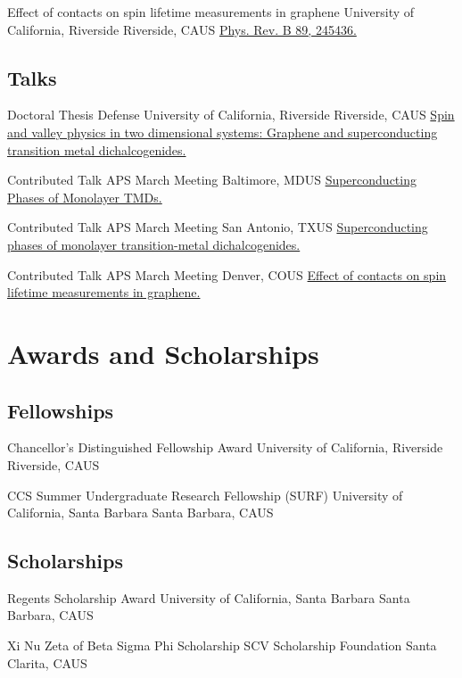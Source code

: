\documentclass[10pt,letter]{moderncv}
\begin{document}
    {Effect of contacts on spin lifetime measurements in graphene}
    {University of California, Riverside}
    {Riverside, CA}{US}
    {\href{https://journals.aps.org/prb/abstract/10.1103/PhysRevB.89.245436}
      {Phys. Rev. B 89, 245436.}}

  \subsection{Talks}

    {Doctoral Thesis Defense}
    {University of California, Riverside}
    {Riverside, CA}{US}
    {\href{https://evansosenko.com/deck-doctoral-thesis/}
      {Spin and valley physics in two dimensional systems: Graphene and superconducting transition metal dichalcogenides.}}

    {Contributed Talk}
    {APS March Meeting}
    {Baltimore, MD}{US}
    {\href{https://evansosenko.com/deck-tmdsc/}
      {Superconducting Phases of Monolayer TMDs.}}

    {Contributed Talk}
    {APS March Meeting}
    {San Antonio, TX}{US}
    {\href{https://evansosenko.com/deck-dichalcogenides-superconductivity/}
      {Superconducting phases of monolayer transition-metal dichalcogenides.}}

    {Contributed Talk}
    {APS March Meeting}
    {Denver, CO}{US}
    {\href{https://evansosenko.com/deck-spin-lifetime/}
      {Effect of contacts on spin lifetime measurements in graphene.}}

  \section{Awards and Scholarships}

  \subsection{Fellowships}

    {Chancellor's Distinguished Fellowship Award}
    {University of California, Riverside}
    {Riverside, CA}{US}{}

    {CCS Summer Undergraduate Research Fellowship (SURF)}
    {University of California, Santa Barbara}
    {Santa Barbara, CA}{US}{}

  \subsection{Scholarships}

    {Regents Scholarship Award}
    {University of California, Santa Barbara}
    {Santa Barbara, CA}{US}{}

    {Xi Nu Zeta of Beta Sigma Phi Scholarship}
    {SCV Scholarship Foundation}
    {Santa Clarita, CA}{US}{}
\end{document}

